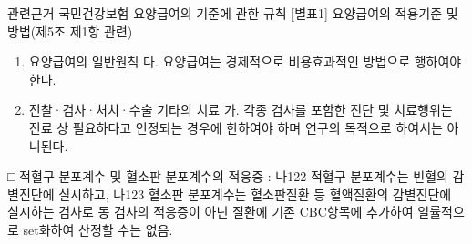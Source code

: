 \begin{commentbox}{관련근거}
국민건강보험 요양급여의 기준에 관한 규칙 [별표1] 요양급여의 적용기준 및 방법(제5조 제1항 관련)
\begin{enumerate}[1.]\tightlist
\item 요양급여의 일반원칙  다. 요양급여는 경제적으로 비용효과적인 방법으로 행하여야 한다.
\item 진찰·검사·처치·수술 기타의 치료  가. 각종 검사를 포함한 진단 및 치료행위는 진료 상 필요하다고 인정되는 경우에 한하여야 하며 연구의 목적으로 하여서는 아니된다.
\end{enumerate}
□ 적혈구 분포계수 및 혈소판 분포계수의 적응증 : 나122 적혈구 분포계수는 빈혈의 감별진단에 실시하고, 나123 혈소판 분포계수는 혈소판질환 등 혈액질환의 감별진단에 실시하는 검사로 동 검사의 적응증이 아닌 질환에 기존 CBC항목에 추가하여 일률적으로 set화하여 산정할 수는 없음.
\end{commentbox}
\prezi{\clearpage}
